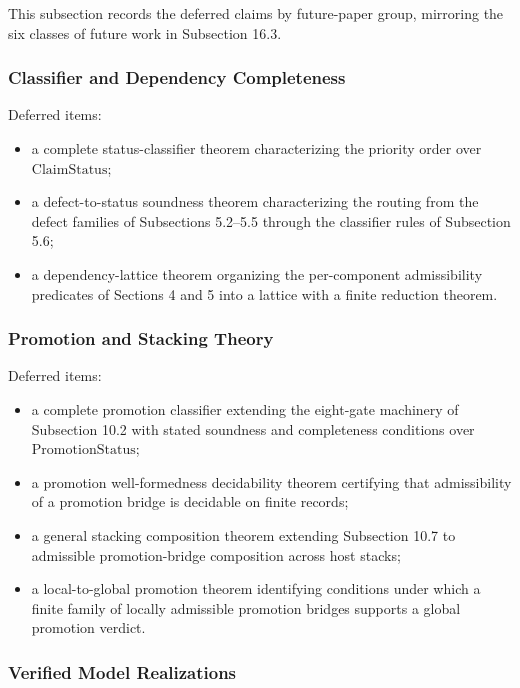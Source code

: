 \documentclass[11pt]{article}
\providecommand{\tightlist}{}
\theoremstyle{definition}
\begin{document}
This subsection records the deferred claims by future-paper group, mirroring the six classes of future work in Subsection 16.3.

\subsubsection{Classifier and Dependency Completeness}

Deferred items:

\begin{itemize}
\tightlist
\item
  a complete status-classifier theorem characterizing the priority order over \(\mathrm{ClaimStatus}\);
\item
  a defect-to-status soundness theorem characterizing the routing from the defect families of Subsections 5.2--5.5 through the classifier rules of Subsection 5.6;
\item
  a dependency-lattice theorem organizing the per-component admissibility predicates of Sections 4 and 5 into a lattice with a finite reduction theorem.
\end{itemize}

\subsubsection{Promotion and Stacking Theory}

Deferred items:

\begin{itemize}
\tightlist
\item
  a complete promotion classifier extending the eight-gate machinery of Subsection 10.2 with stated soundness and completeness conditions over \(\mathrm{PromotionStatus}\);
\item
  a promotion well-formedness decidability theorem certifying that admissibility of a promotion bridge is decidable on finite records;
\item
  a general stacking composition theorem extending Subsection 10.7 to admissible promotion-bridge composition across host stacks;
\item
  a local-to-global promotion theorem identifying conditions under which a finite family of locally admissible promotion bridges supports a global promotion verdict.
\end{itemize}

\subsubsection{Verified Model Realizations}
\end{document}
